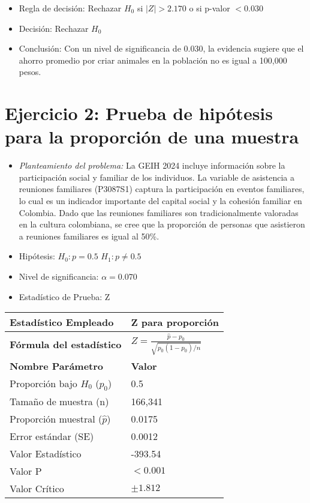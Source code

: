 \documentclass[12pt,a4paper]{article}
\begin{document}
\begin{itemize}
    \item Regla de decisión: Rechazar $H_0$ si $|Z| > 2.170$ o si p-valor $< 0.030$
    \item Decisión: Rechazar $H_0$
    \item Conclusión: Con un nivel de significancia de 0.030, la evidencia sugiere que el ahorro promedio por criar animales en la población no es igual a 100,000 pesos.
\end{itemize}

\section*{Ejercicio 2: Prueba de hipótesis para la proporción de una muestra}
\begin{itemize}
    \item \textit{Planteamiento del problema:} La GEIH 2024 incluye información sobre la participación social y familiar de los individuos. La variable de asistencia a reuniones familiares (P3087S1) captura la participación en eventos familiares, lo cual es un indicador importante del capital social y la cohesión familiar en Colombia. Dado que las reuniones familiares son tradicionalmente valoradas en la cultura colombiana, se cree que la proporción de personas que asistieron a reuniones familiares es igual al 50\%.
    \item Hipótesis: \quad $H_{0}: p = 0.5$ \hspace{2cm} $H_{1}: p \neq 0.5$
    \item Nivel de significancia: $\alpha = 0.070$
    \item Estadístico de Prueba: Z
\end{itemize}

\begin{tabular}{|m{7cm}|m{7cm}|}
\hline
\textbf{Estadístico Empleado} & Z para proporción \\ \hline
\textbf{Fórmula del estadístico} & $Z = \frac{\hat{p} - p_0}{\sqrt{p_0(1-p_0)/n}}$ \\ \hline
\textbf{Nombre Parámetro} & \textbf{Valor} \\ \hline
Proporción bajo $H_0$ ($p_0$) & 0.5 \\ \hline
Tamaño de muestra (n) & 166,341 \\ \hline
Proporción muestral ($\hat{p}$) & 0.0175 \\ \hline
Error estándar (SE) & 0.0012 \\ \hline
Valor Estadístico & -393.54 \\ \hline
Valor P & $< 0.001$ \\ \hline
Valor Crítico & $\pm 1.812$ \\ \hline
\end{tabular}
\end{document}
